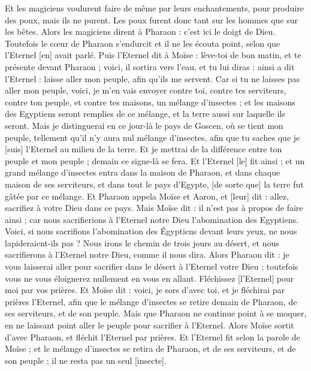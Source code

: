 \begin{multicols}{2}
Et les magiciens voulurent faire de même par leurs enchantements, pour produire des poux, mais ils ne purent. Les poux furent donc tant sur les hommes que sur les bêtes.
Alors les magiciens dirent à Pharaon : c'est ici le doigt de Dieu. Toutefois le cœur de Pharaon s'endurcit et il ne les écouta point, selon que l'Eternel [en] avait parlé.
Puis l'Eternel dit à Moïse : lève-toi de bon matin, et te présente devant Pharaon ; voici, il sortira vers l'eau, et tu lui diras : ainsi a dit l'Eternel : laisse aller mon peuple, afin qu'ils me servent.
Car si tu ne laisses pas aller mon peuple, voici, je m'en vais envoyer contre toi, contre tes serviteurs, contre ton peuple, et contre tes maisons, un mélange d'insectes ; et les maisons des Egyptiens seront remplies de ce mélange, et la terre aussi sur laquelle ils seront.
Mais je distinguerai en ce jour-là le pays de Goscen, où se tient mon peuple, tellement qu'il n'y aura nul mélange d'insectes, afin que tu saches que je [suis] l'Eternel au milieu de la terre.
Et je mettrai de la différence entre ton peuple et mon peuple ; demain ce signe-là se fera.
Et l'Eternel [le] fit ainsi ; et un grand mélange d'insectes entra dans la maison de Pharaon, et dans chaque maison de ses serviteurs, et dans tout le pays d'Egypte, [de sorte que] la terre fut gâtée par ce mélange.
Et Pharaon appela Moïse et Aaron, et [leur] dit : allez, sacrifiez à votre Dieu dans ce pays.
Mais Moïse dit : il n'est pas à propos de faire ainsi ; car nous sacrifierions à l'Eternel notre Dieu l'abomination des Egyptiens. Voici, si nous sacrifions l'abomination des Égyptiens devant leurs yeux, ne nous lapideraient-ils pas ?
Nous irons le chemin de trois jours au désert, et nous sacrifierons à l'Eternel notre Dieu, comme il nous dira.
Alors Pharaon dit : je vous laisserai aller pour sacrifier dans le désert à l'Eternel votre Dieu ; toutefois vous ne vous éloignerez nullement en vous en allant. Fléchissez [l'Eternel] pour moi par vos prières.
Et Moïse dit : voici, je sors d'avec toi, et je fléchirai par prières l'Eternel, afin que le mélange d'insectes se retire demain de Pharaon, de ses serviteurs, et de son peuple. Mais que Pharaon ne continue point à se moquer, en ne laissant point aller le peuple pour sacrifier à l'Eternel.
Alors Moïse sortit d'avec Pharaon, et fléchit l'Eternel par prières.
Et l'Eternel fit selon la parole de Moïse ; et le mélange d'insectes se retira de Pharaon, et de ses serviteurs, et de son peuple ; il ne resta pas un seul [insecte].

\end{multicols}

